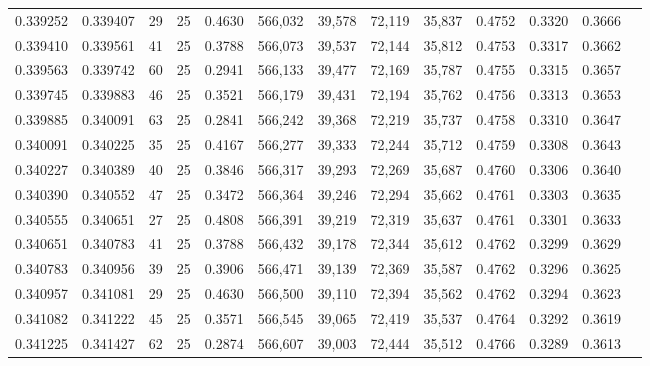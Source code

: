 \begin{tabular}{rrrrrrrrrrrrr}
0.339252 & 0.339407 &    29 &  25 &                                     0.4630 & 566,032 &  39,578 &  72,119 &  35,837 & 0.4752 & 0.3320 & 0.3666 \\
0.339410 & 0.339561 &    41 &  25 &                                     0.3788 & 566,073 &  39,537 &  72,144 &  35,812 & 0.4753 & 0.3317 & 0.3662 \\
0.339563 & 0.339742 &    60 &  25 &                                     0.2941 & 566,133 &  39,477 &  72,169 &  35,787 & 0.4755 & 0.3315 & 0.3657 \\
0.339745 & 0.339883 &    46 &  25 &                                     0.3521 & 566,179 &  39,431 &  72,194 &  35,762 & 0.4756 & 0.3313 & 0.3653 \\
0.339885 & 0.340091 &    63 &  25 &                                     0.2841 & 566,242 &  39,368 &  72,219 &  35,737 & 0.4758 & 0.3310 & 0.3647 \\
0.340091 & 0.340225 &    35 &  25 &                                     0.4167 & 566,277 &  39,333 &  72,244 &  35,712 & 0.4759 & 0.3308 & 0.3643 \\
0.340227 & 0.340389 &    40 &  25 &                                     0.3846 & 566,317 &  39,293 &  72,269 &  35,687 & 0.4760 & 0.3306 & 0.3640 \\
0.340390 & 0.340552 &    47 &  25 &                                     0.3472 & 566,364 &  39,246 &  72,294 &  35,662 & 0.4761 & 0.3303 & 0.3635 \\
0.340555 & 0.340651 &    27 &  25 &                                     0.4808 & 566,391 &  39,219 &  72,319 &  35,637 & 0.4761 & 0.3301 & 0.3633 \\
0.340651 & 0.340783 &    41 &  25 &                                     0.3788 & 566,432 &  39,178 &  72,344 &  35,612 & 0.4762 & 0.3299 & 0.3629 \\
0.340783 & 0.340956 &    39 &  25 &                                     0.3906 & 566,471 &  39,139 &  72,369 &  35,587 & 0.4762 & 0.3296 & 0.3625 \\
0.340957 & 0.341081 &    29 &  25 &                                     0.4630 & 566,500 &  39,110 &  72,394 &  35,562 & 0.4762 & 0.3294 & 0.3623 \\
0.341082 & 0.341222 &    45 &  25 &                                     0.3571 & 566,545 &  39,065 &  72,419 &  35,537 & 0.4764 & 0.3292 & 0.3619 \\
0.341225 & 0.341427 &    62 &  25 &                                     0.2874 & 566,607 &  39,003 &  72,444 &  35,512 & 0.4766 & 0.3289 & 0.3613 \\

\end{tabular}
